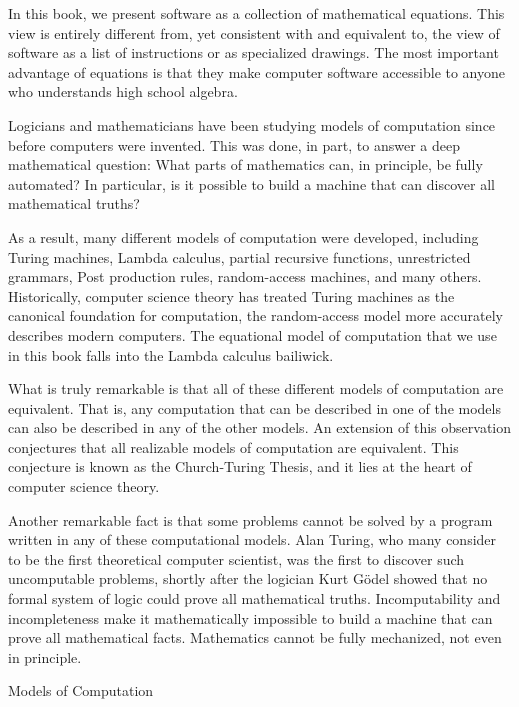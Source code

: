 In this book, we present software as a collection of mathematical
equations.  This view is entirely different from, yet consistent with
and equivalent to, the view of
software as a list of instructions or as specialized drawings.
The most important advantage of equations is that they make computer software accessible to anyone who understands high school algebra.

\begin{aside}
Logicians and mathematicians have been studying models of computation
since before computers were invented. This was done, in part, to
answer a deep mathematical question: What parts of mathematics can,
in principle, be fully automated?  In particular, is it possible to
build a machine that can discover all mathematical truths?

As a result, many different models of computation were developed,
including Turing machines, Lambda calculus, partial recursive
functions, unrestricted grammars, Post production rules, random-access
machines, and many others.  Historically, computer science theory has
treated Turing machines as the canonical foundation for computation,
the random-access model more accurately describes modern computers.
The equational model of computation that we use in this book falls
into the Lambda calculus bailiwick.

What is truly remarkable is that all of these different models of
computation are equivalent.  That is,
any computation that can be described in one of the models can also
be described in any of the other models.  An extension of this observation
conjectures that all realizable models
of computation are equivalent.  This conjecture is known as the
Church-Turing Thesis, and it lies at the heart of computer science
theory.

Another remarkable fact is that some problems cannot be solved by a program
written in any of these computational models. Alan
Turing, who many consider to be the first theoretical computer
scientist, was the first to discover such uncomputable problems,
shortly after the logician Kurt G\"odel showed that no formal system
of logic could prove all mathematical truths.  
Incomputability and incompleteness make it mathematically impossible 
to build a machine that can prove all mathematical facts.
Mathematics cannot be fully mechanized, not even in principle.

\caption{Models of Computation}
\label{aside-model-of-computation}
\end{aside}

